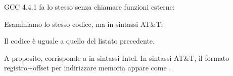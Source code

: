 
GCC 4.4.1 fa lo stesso senza chiamare funzioni esterne:




Esaminiamo lo stesso codice, ma in sintassi AT\&T:



\myindex{\ATTSyntax}
Il codice è uguale a quello del listato precedente.

A proposito,  corrisponde a  in sintassi Intel.
In sintassi AT\&T, il formato registro+offset per indirizzare memoria appare come .
